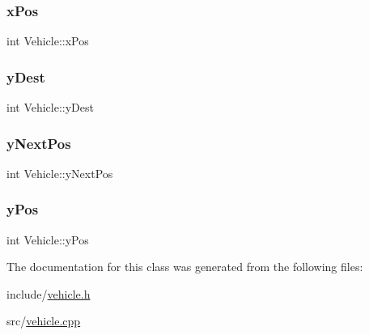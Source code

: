 \subsubsection{\texorpdfstring{x\+Pos}{xPos}}
{\footnotesize\ttfamily int Vehicle\+::x\+Pos\hspace{0.3cm}{\ttfamily [protected]}}

\hypertarget{class_vehicle_acddc414f0c2f5c40d54462fb4ac44d7d}{}\label{class_vehicle_acddc414f0c2f5c40d54462fb4ac44d7d} 
\subsubsection{\texorpdfstring{y\+Dest}{yDest}}
{\footnotesize\ttfamily int Vehicle\+::y\+Dest\hspace{0.3cm}{\ttfamily [protected]}}

\hypertarget{class_vehicle_a51e06932f2d09761aa78a98d6d999588}{}\label{class_vehicle_a51e06932f2d09761aa78a98d6d999588} 
\subsubsection{\texorpdfstring{y\+Next\+Pos}{yNextPos}}
{\footnotesize\ttfamily int Vehicle\+::y\+Next\+Pos\hspace{0.3cm}{\ttfamily [protected]}}

\hypertarget{class_vehicle_a7525979f84d06b888d15200ad42f1ef2}{}\label{class_vehicle_a7525979f84d06b888d15200ad42f1ef2} 
\subsubsection{\texorpdfstring{y\+Pos}{yPos}}
{\footnotesize\ttfamily int Vehicle\+::y\+Pos\hspace{0.3cm}{\ttfamily [protected]}}



The documentation for this class was generated from the following files\+:\begin{DoxyCompactItemize}
\item 
include/\hyperlink{vehicle_8h}{vehicle.\+h}\item 
src/\hyperlink{vehicle_8cpp}{vehicle.\+cpp}\end{DoxyCompactItemize}
